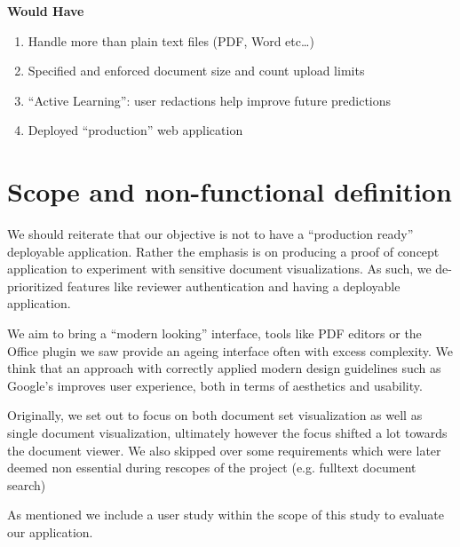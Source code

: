 \documentclass[\version]{l4proj}
\begin{document}
\begin{adjustbox}{width=0.9\textwidth,center}
    \begin{minipage}[t]{\linewidth}
        \centerline{\textbf{Would Have}}
        \begin{multicols}{2}
            \begin{enumerate}[noitemsep,nolistsep,label=\textbf{W\arabic*}]
                \item Handle more than plain text files (PDF, Word etc…)
                \item Specified and enforced document size and count upload limits
                \item ``Active Learning'': user redactions help improve future predictions
                \item Deployed ``production'' web application
            \end{enumerate}
        \end{multicols}
    \end{minipage}
\end{adjustbox}
\section{Scope and non-functional definition}

We should reiterate that our objective is not to have a ``production ready'' deployable application.
Rather the emphasis is on producing a proof of concept application to experiment with sensitive document visualizations.
As such, we de-prioritized features like reviewer authentication and having a deployable application.

We aim to bring a ``modern looking'' interface, tools like PDF editors or the Office plugin we saw provide an ageing interface often with excess complexity.
We think that an approach with correctly applied modern design guidelines such as Google's \textcite{MaterialDesign} improves user experience, both in terms of aesthetics and usability.

Originally, we set out to focus on both document set visualization as well as single document visualization, ultimately however the focus shifted a lot towards the document viewer.
We also skipped over some requirements which were later deemed non essential during rescopes of the project (e.g. fulltext document search)

As mentioned we include a user study within the scope of this study to evaluate our application.
\end{document}

